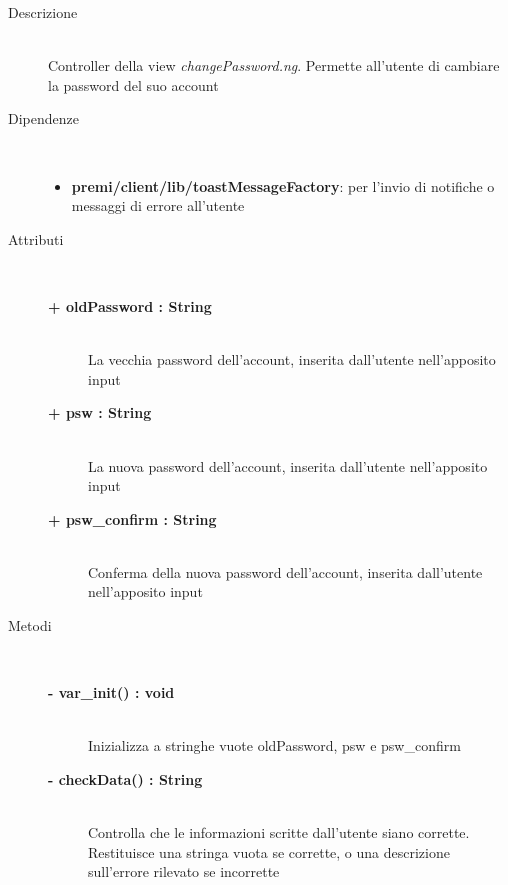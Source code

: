 \begin{description}
\item[Descrizione] \hfill \\
	Controller della view \textit{changePassword.ng}. Permette all'utente di cambiare la password del suo account
	
	
	
\item[Dipendenze] \hfill \\
	\begin{itemize}
		\item \textbf{premi/client/lib/toastMessageFactory}: per l'invio di notifiche o messaggi di errore all'utente
	\end{itemize}
	
	
\item[Attributi] \hfill \\
	\begin{description}
		\item[\textbf{+ oldPassword : String			}] \hfill \\
			La vecchia password dell'account, inserita dall'utente nell'apposito input
		\item[\textbf{+ psw : String			}] \hfill \\
			La nuova password dell'account, inserita dall'utente nell'apposito input
		\item[\textbf{+ psw\_confirm : String			}] \hfill \\
			Conferma della nuova password dell'account, inserita dall'utente nell'apposito input
	\end{description}
	
	
\item[Metodi] \hfill \\

	\begin{description}
		\item[\textbf{\color{blue}- var\_init() : void			}] \hfill \\
			Inizializza a stringhe vuote oldPassword, psw e psw\_confirm
	\end{description}
	
	\begin{description}
		\item[\textbf{\color{blue}- checkData() : String			}] \hfill \\
			Controlla che le informazioni scritte dall'utente siano corrette. Restituisce una stringa vuota se corrette, o una descrizione sull'errore rilevato se incorrette
	\end{description}
	

\end{description}
